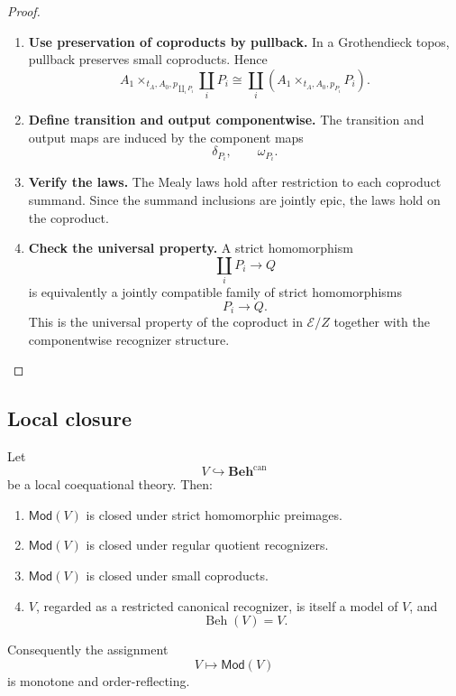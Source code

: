 \begin{proof}
    \leavevmode
    \begin{enumerate}
        \item \textbf{Use preservation of coproducts by pullback.}
        In a Grothendieck topos, pullback preserves small coproducts. Hence
        \[
            A_1\times_{t_A,A_0,p_{\coprod_iP_i}}
            \coprod_iP_i
            \cong
            \coprod_i
            \left(
                A_1\times_{t_A,A_0,p_{P_i}}P_i
            \right).
        \]

        \item \textbf{Define transition and output componentwise.}
        The transition and output maps are induced by the component maps
        \[
            \delta_{P_i},
            \qquad
            \omega_{P_i}.
        \]

        \item \textbf{Verify the laws.}
        The Mealy laws hold after restriction to each coproduct summand. Since
        the summand inclusions are jointly epic, the laws hold on the coproduct.

        \item \textbf{Check the universal property.}
        A strict homomorphism
        \[
            \coprod_iP_i\to Q
        \]
        is equivalently a jointly compatible family of strict homomorphisms
        \[
            P_i\to Q.
        \]
        This is the universal property of the coproduct in \(\mathcal E/Z\)
        together with the componentwise recognizer structure.
    \end{enumerate}
\end{proof}

\subsection{Local closure}
\label{subsec:local-coequational-closure}

\begin{theorem}
\label{thm:local-coequational-closure}
    Let
    \[
        V\hookrightarrow\mathbf{Beh}^{\mathrm{can}}
    \]
    be a local coequational theory. Then:
    \begin{enumerate}
        \item \(\mathsf{Mod}(V)\) is closed under strict homomorphic preimages.
        \item \(\mathsf{Mod}(V)\) is closed under regular quotient recognizers.
        \item \(\mathsf{Mod}(V)\) is closed under small coproducts.
        \item \(V\), regarded as a restricted canonical recognizer, is itself a
        model of \(V\), and
        \[
            \operatorname{Beh}(V)=V.
        \]
    \end{enumerate}
    Consequently the assignment
    \[
        V\longmapsto\mathsf{Mod}(V)
    \]
    is monotone and order-reflecting.
\end{theorem}

